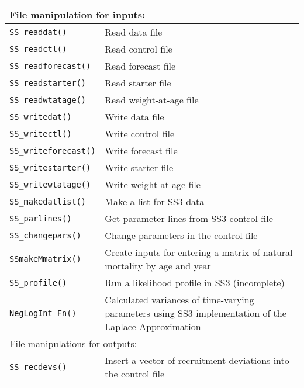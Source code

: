 \begin{center}
\begin{longtable}{p{4.6cm} p{10.52cm}}
		\multicolumn{2}{l}{File manipulation for inputs:} \Tstrut\Bstrut\\
		\hline
		\texttt{SS\_readdat()} \Tstrut & Read data file \\
		\texttt{SS\_readctl()} \Tstrut & Read  control file \\
		\texttt{SS\_readforecast()} \Tstrut & Read forecast file \\
		\texttt{SS\_readstarter()} \Tstrut & Read starter file \\
		\texttt{SS\_readwtatage()} \Tstrut & Read weight-at-age file \\
		\texttt{SS\_writedat()} \Tstrut & Write data file \\
		\texttt{SS\_writectl()} \Tstrut & Write control file \\
		\texttt{SS\_writeforecast()} \Tstrut & Write forecast file \\
		\texttt{SS\_writestarter()} \Tstrut & Write starter file \\
		\texttt{SS\_writewtatage()} \Tstrut & Write weight-at-age file \\
		\texttt{SS\_makedatlist()} \Tstrut & Make a list for SS3 data \\
		\texttt{SS\_parlines()} \Tstrut & Get parameter lines from SS3 control file \\
		\texttt{SS\_changepars()} \Tstrut  & Change parameters in the control file \\
		\texttt{SSmakeMmatrix()} \Tstrut & Create inputs for entering a matrix of natural mortality by age and year \\
		\texttt{SS\_profile()} \Tstrut & Run a likelihood profile in SS3 (incomplete) \\
		\texttt{NegLogInt\_Fn()} \Tstrut & Calculated variances of time-varying parameters using SS3 implementation of the Laplace Approximation \Bstrut\\
		\hline
		
		\multicolumn{2}{l}{File manipulations for outputs:} \Tstrut\Bstrut\\
		\hline
		\texttt{SS\_recdevs()} \Tstrut & Insert a vector of recruitment deviations into the control file \\
		\hline

	\end{longtable}
\end{center}

\pagebreak
